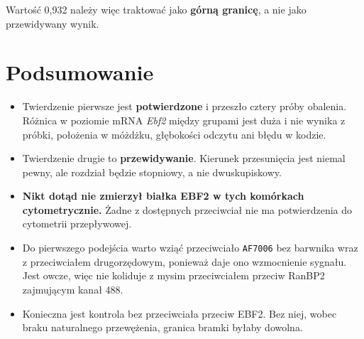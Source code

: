\documentclass[a4paper,11pt]{report}
\begin{document}
Wartość 0,932 należy więc traktować jako \textbf{górną granicę}, a nie jako
przewidywany wynik.

\chapter{Podsumowanie}

\begin{itemize}
    \item Twierdzenie pierwsze jest \textbf{potwierdzone} i przeszło cztery próby
    obalenia. Różnica w poziomie mRNA \textit{Ebf2} między grupami jest duża
    i nie wynika z próbki, położenia w móżdżku, głębokości odczytu ani błędu w kodzie.

    \item Twierdzenie drugie to \textbf{przewidywanie}. Kierunek przesunięcia
    jest niemal pewny, ale rozdział będzie stopniowy, a nie dwuskupiskowy.

    \item \textbf{Nikt dotąd nie zmierzył białka EBF2 w tych komórkach cytometrycznie.}
    Żadne z dostępnych przeciwciał nie ma potwierdzenia do cytometrii przepływowej.

    \item Do pierwszego podejścia warto wziąć przeciwciało \texttt{AF7006} bez
    barwnika wraz z przeciwciałem drugorzędowym, ponieważ daje ono wzmocnienie
    sygnału. Jest owcze, więc nie koliduje z mysim przeciwciałem przeciw RanBP2
    zajmującym kanał 488.

    \item Konieczna jest kontrola bez przeciwciała przeciw EBF2. Bez niej,
    wobec braku naturalnego przewężenia, granica bramki byłaby dowolna.
\end{itemize}
\end{document}
